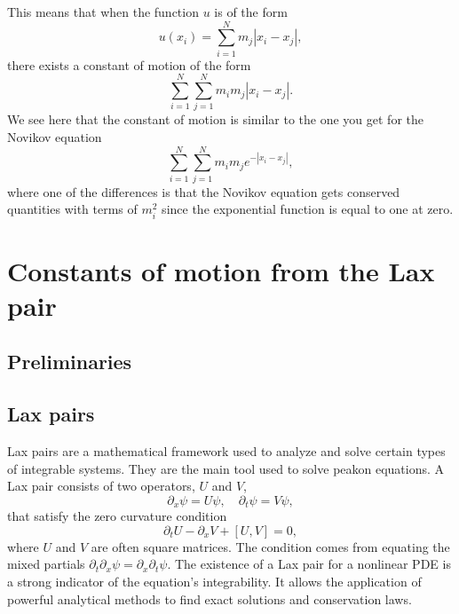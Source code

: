 \documentclass[english,master]{liumaiex}
\theoremstyle{plain}
\theoremstyle{definition}
\begin{document}
This means that when the function $u$ is of the form 
\begin{equation}
	u(x_i) = \sum_{i=1}^{N} m_j |x_i - x_j|,
\end{equation}
there exists a constant of motion of the form
\begin{equation}
	\sum_{i=1}^{N}\sum_{j=1}^N m_i m_j |x_i - x_j|.
\end{equation}
We see here that the constant of motion is similar to the one you get for the Novikov equation
\begin{equation}
	\sum_{i=1}^{N}\sum_{j=1}^N m_i m_j e^{-|x_i - x_j|},
\end{equation}
where one of the differences is that the Novikov equation gets conserved quantities with terms of $m_i^2$ since the exponential function is equal to one at zero.

\section{Constants of motion from the Lax pair} \label{sec:ZeroCurvature}

\subsection{Preliminaries}
\subsection*{Lax pairs}

Lax pairs are a mathematical framework used to analyze and solve certain types of integrable systems. They are the main tool used to solve peakon equations. A Lax pair consists of two operators, $U$ and $V$,
\begin{equation}
	\partial_x \psi = U \psi, \quad \partial_t \psi = V \psi,
\end{equation}
that satisfy the zero curvature condition
\begin{equation}
	\partial_t U - \partial_x V + [U, V] = 0,
\end{equation}
where $U$ and $V$ are often square matrices. The condition comes from equating the mixed partials $\partial_t \partial_x \psi = \partial_x \partial_t \psi$. The existence of a Lax pair for a nonlinear PDE is a strong indicator of the equation's integrability. It allows the application of powerful analytical methods to find exact solutions and conservation laws.
\end{document}
